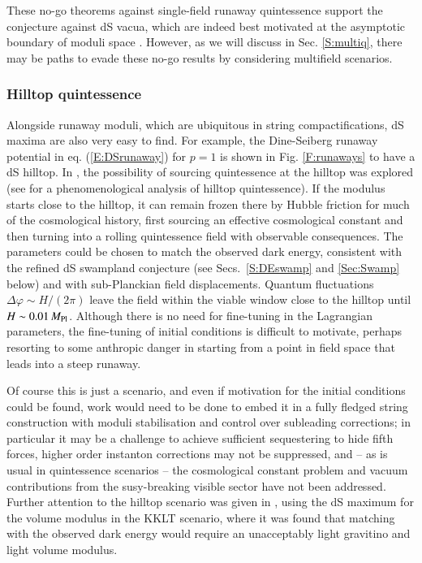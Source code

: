 These no-go theorems against single-field runaway quintessence support the conjecture against dS vacua, which are indeed best motivated at the asymptotic boundary of moduli space \cite{Ooguri:2018wrx}. However, as we will discuss in Sec. \ref{S:multiq}, there may be paths to 
evade these no-go results by considering multifield scenarios.

\subsubsection{Hilltop quintessence}

Alongside runaway moduli, which are ubiquitous in string compactifications, dS maxima are also very easy to find. For example, the Dine-Seiberg runaway potential in eq. (\ref{E:DSrunaway}) for $p=1$ is shown in Fig. \ref{F:runaways} to have a dS hilltop. In \cite{Olguin-Tejo:2018pfq}, the possibility of sourcing quintessence at the hilltop was explored (see \cite{Dutta:2008qn} for a phenomenological analysis of hilltop quintessence). If the modulus starts close to the hilltop, it can remain frozen there by Hubble friction for much of the cosmological history, first sourcing an effective cosmological constant and then turning into a rolling quintessence field with observable consequences. The parameters could be chosen to match the observed dark energy, consistent with the refined dS swampland conjecture (see Secs.~\ref{S:DEswamp} and \ref{Sec:Swamp} below) and with sub-Planckian field displacements. Quantum fluctuations $\Delta \varphi \sim H/(2\pi)$ leave the field within the viable window close to the hilltop until $H \sim 0.01\,M_{\rm Pl}$. Although there is no need for fine-tuning in the Lagrangian parameters, the fine-tuning of initial conditions is difficult to motivate, perhaps resorting to some anthropic danger in starting from a point in field space that leads into a steep runaway.

Of course this is just a scenario, and even if motivation for the initial conditions could be found, work would need to be done to embed it in a fully fledged string construction with moduli stabilisation and control over subleading corrections; in particular it may be a challenge to achieve sufficient sequestering to hide fifth forces, higher order instanton corrections may not be suppressed, and -- as is usual in quintessence scenarios -- the cosmological constant problem and vacuum contributions from the susy-breaking visible sector have not been addressed. Further attention to the hilltop scenario was given in \cite{Cicoli:2021skd}, using the dS maximum for the volume modulus in the KKLT scenario, where it was found that matching with the observed dark energy would require an unacceptably light gravitino and light volume modulus.


